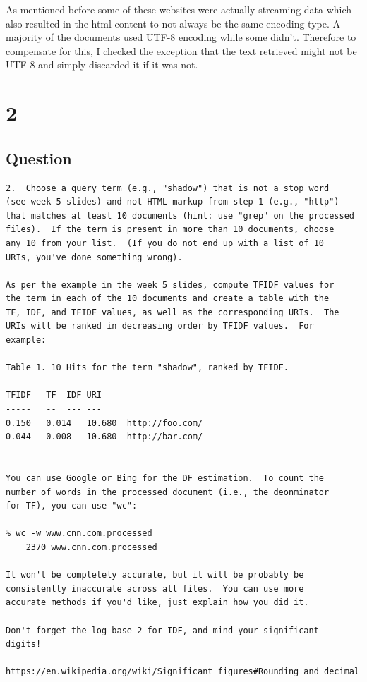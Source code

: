 \documentclass[letterpaper,11pt]{article}
\newcommand*{\srcPath}{../src}%
\begin{document}
As mentioned before some of these websites were actually streaming data which also resulted in the html content to not always be the same encoding type. A majority of the documents used UTF-8 encoding while some didn't. Therefore to compensate for this, I checked the exception that the text retrieved might not be UTF-8 and simply discarded it if it was not. 




\clearpage


\section*{2}

\subsection*{Question}

\begin{verbatim}
2.  Choose a query term (e.g., "shadow") that is not a stop word
(see week 5 slides) and not HTML markup from step 1 (e.g., "http")
that matches at least 10 documents (hint: use "grep" on the processed
files).  If the term is present in more than 10 documents, choose
any 10 from your list.  (If you do not end up with a list of 10
URIs, you've done something wrong).

As per the example in the week 5 slides, compute TFIDF values for
the term in each of the 10 documents and create a table with the
TF, IDF, and TFIDF values, as well as the corresponding URIs.  The
URIs will be ranked in decreasing order by TFIDF values.  For
example:

Table 1. 10 Hits for the term "shadow", ranked by TFIDF.

TFIDF	TF	IDF	URI
-----	--	---	---
0.150	0.014	10.680	http://foo.com/
0.044	0.008	10.680	http://bar.com/


You can use Google or Bing for the DF estimation.  To count the
number of words in the processed document (i.e., the deonminator
for TF), you can use "wc":

% wc -w www.cnn.com.processed
    2370 www.cnn.com.processed

It won't be completely accurate, but it will be probably be
consistently inaccurate across all files.  You can use more 
accurate methods if you'd like, just explain how you did it.  

Don't forget the log base 2 for IDF, and mind your significant
digits!

https://en.wikipedia.org/wiki/Significant_figures#Rounding_and_decimal_places
\end{verbatim}
\end{document}
